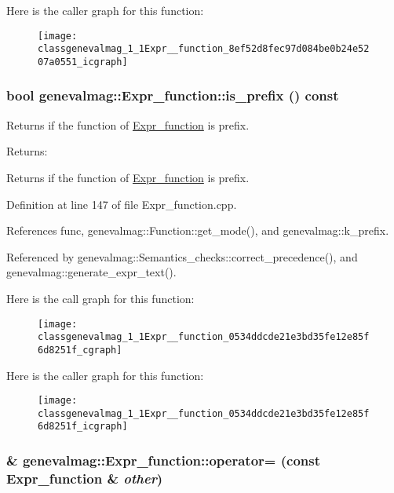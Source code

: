 Here is the caller graph for this function:\nopagebreak
\begin{figure}[H]
\begin{center}
\leavevmode
\texttt{[image: classgenevalmag\_1\_1Expr\_\_function\_8ef52d8fec97d084be0b24e5207a0551\_icgraph]}
\end{center}
\end{figure}
\hypertarget{classgenevalmag_1_1Expr__function_0534ddcde21e3bd35fe12e85f6d8251f}{
\subsubsection[{is\_\-prefix}]{\setlength{\rightskip}{0pt plus 5cm}bool genevalmag::Expr\_\-function::is\_\-prefix () const}}
\label{classgenevalmag_1_1Expr__function_0534ddcde21e3bd35fe12e85f6d8251f}


Returns if the function of \hyperlink{classgenevalmag_1_1Expr__function}{Expr\_\-function} is prefix. \begin{Desc}
\item[Returns:]\end{Desc}
Returns if the function of \hyperlink{classgenevalmag_1_1Expr__function}{Expr\_\-function} is prefix. 

Definition at line 147 of file Expr\_\-function.cpp.

References func, genevalmag::Function::get\_\-mode(), and genevalmag::k\_\-prefix.

Referenced by genevalmag::Semantics\_\-checks::correct\_\-precedence(), and genevalmag::generate\_\-expr\_\-text().

Here is the call graph for this function:\nopagebreak
\begin{figure}[H]
\begin{center}
\leavevmode
\texttt{[image: classgenevalmag\_1\_1Expr\_\_function\_0534ddcde21e3bd35fe12e85f6d8251f\_cgraph]}
\end{center}
\end{figure}


Here is the caller graph for this function:\nopagebreak
\begin{figure}[H]
\begin{center}
\leavevmode
\texttt{[image: classgenevalmag\_1\_1Expr\_\_function\_0534ddcde21e3bd35fe12e85f6d8251f\_icgraph]}
\end{center}
\end{figure}
\hypertarget{classgenevalmag_1_1Expr__function_eac7341725e1953e65f251314fde4f54}{
\subsubsection[{operator=}]{ \& genevalmag::Expr\_\-function::operator= (const {\bf Expr\_\-function} \& {\em other})}}
\label{classgenevalmag_1_1Expr__function_eac7341725e1953e65f251314fde4f54}


